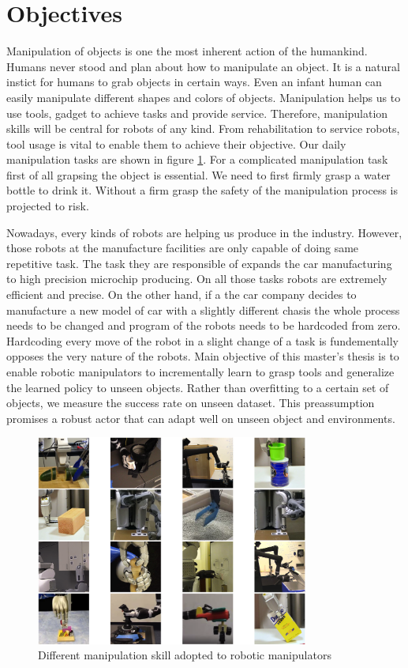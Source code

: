 \section{Objectives}

Manipulation of objects is one the most inherent action of the humankind. Humans never stood and plan about how to manipulate an object. 
It is a natural instict for humans to grab objects in certain ways. Even an infant human can easily manipulate different shapes and colors of objects.
Manipulation helps us to use tools, gadget to achieve tasks and provide service. 
Therefore, manipulation skills will be central for robots of any kind. 
From rehabilitation to service robots, tool usage is vital to enable them to achieve their objective. Our daily manipulation tasks are shown in figure \ref{fig:x manipulation_skills}.
For a complicated manipulation task first of all grapsing the object is essential. We need to first firmly grasp a water bottle to drink it.
Without a firm grasp the safety of the manipulation process is projected to risk. 

Nowadays, every kinds of robots are helping us produce in the industry. However, those robots at the manufacture facilities are only capable of doing same repetitive task. 
The task they are responsible of expands the car manufacturing to high precision microchip producing. On all those tasks robots are extremely efficient and precise. 
On the other hand, if a the car company decides to manufacture a new model of car with a slightly different chasis the whole process needs to be changed and program of the robots needs to be hardcoded from zero.
Hardcoding every move of the robot in a slight change of a task is fundementally opposes the very nature of the robots. 
Main objective of this master's thesis is to enable robotic manipulators to incrementally learn to grasp tools and generalize the learned policy to unseen objects.
Rather than overfitting to a certain set of objects, we measure the success rate on unseen dataset. 
This preassumption promises a robust actor that can adapt well on unseen object and environments.


\begin{figure}[htbp]
    \centering
      \includegraphics[width=0.8\textwidth]{figures/manipulation_skill}
    \caption{Different manipulation skill adopted to robotic manipulators \cite{Kroemer201}}
    \label{fig:x manipulation_skills}
\end{figure}